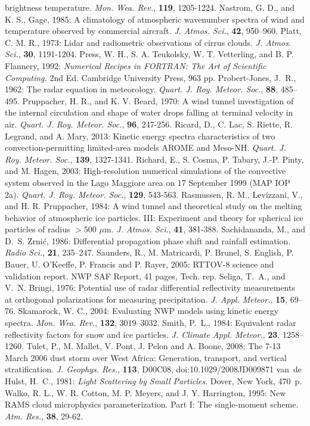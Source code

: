 brightness temperature.
      {\it Mon. Wea. Rev.}, 
      {\bf 119},
      1205-1224.
\decrefname
Nastrom, G. D., and K. S., Gage, 1985: A climatology of atmospheric wavenumber
  spectra of wind and temperature observed by commercial aircraft. {\em J.
  Atmos. Sci.}, {\bf 42}, 950--960.
\decrefname
Platt, C. M. R., 1973: Lidar and radiometric observations of cirrus clouds.
      {\it J. Atmos. Sci.}, 
      {\bf 30},
      1191-1204.
\decrefname
Press, W. H., S. A. Teukolsky, W. T. Vetterling, and B. P. Flannery, 1992:
      {\it Numerical Recipes in FORTRAN: The Art of Scientific Computing.}
      2nd Ed.
      Cambridge University Press,
      963 pp.
\decrefname
Probert-Jones, J.~R., 1962: The radar equation in meteorology. {\em Quart. J.
  Roy. Meteor. Soc.}, {\bf 88}, 485--495.
\decrefname
Pruppacher, H. R., and K. V. Beard, 1970: 
      A wind tunnel investigation of the internal circulation and shape of 
      water drops falling at terminal velocity in air.
      {\it Quart. J. Roy. Meteor. Soc.},
      {\bf 96},
      247-256.
\decrefname
Ricard, D., C. Lac, S. Riette, R. Legrand, and A. Mary, 2013: 
Kinetic energy spectra characteristics of two convection-permitting limited-area models AROME and Meso-NH.
{\it Quart. J. Roy. Meteor. Soc.}, {\bf 139}, 1327-1341.
\decrefname
Richard, E., S. Cosma, P. Tabary, J.-P. Pinty, and M. Hagen, 2003:
      High-resolution numerical simulations of the convective system observed
      in the Lago Maggiore area on 17 September 1999 (MAP IOP 2a).
      {\it Quart. J. Roy. Meteor. Soc.},
      {\bf 129},
      543-563.
\decrefname
Rasmussen, R. M., Levizzani, V., and H. R. Pruppacher, 1984:
      A wind tunnel and theoretical study on the melting behavior of 
      atmospheric ice particles. III: Experiment and theory for spherical 
      ice particles of radius $>500$ $\mu$m.
      {\it J. Atmos. Sci.},
      {\bf 41},
      381-388.
\decrefname
Sachidananda, M., and D.~S. Zrni\'c, 1986: Differential propagation phase shift
  and rainfall estimation. {\em Radio Sci.}, {\bf 21}, 235--247.
\decrefname
Saunders, R., M. Matricardi, P. Brunel, S. English, P. Bauer, U. O'Keeffe, P.
Francis and P. Rayer, 2005: RTTOV-8 science and validation report. NWP SAF
Report, 41 pages, Tech. rep.
\decrefname
Seliga, T.~A., and V.~N. Bringi, 1976: Potential use of radar differential
  reflectivity measurements at orthogonal polarizations for measuring
  precipitation. {\em J. Appl. Meteor.}, {\bf 15}, 69--76.
\decrefname
Skamarock, W. C., 2004: Evaluating NWP models using kinetic energy spectra.
  {\em Mon. Wea. Rev.}, {\bf 132}, 3019--3032.
\decrefname
Smith, P.~L., 1984: Equivalent radar reflectivity factors for snow and ice
  particles. {\em J. Climate Appl. Meteor.}, {\bf 23}, 1258--1260.
\decrefname
Tulet, P., M. Mallet, V. Pont, J. Pelon and A. Boone, 2008: The 7-13 March 2006 dust
  storm over West Africa: Generation, transport, and vertical stratification.
  {\it J. Geophys. Res.}, {\bf 113}, D00C08, doi:10.1029/2008JD009871
\decrefname
van~de Hulst, H.~C., 1981: {\em Light Scattering by Small Particles}. Dover,
  New York, 470~p.
\decrefname
Walko, R. L., W. R. Cotton, M. P. Meyers, and J. Y. Harrington, 1995:
      New RAMS cloud microphysics parameterization. Part I: The single-moment
      scheme.
      {\it Atm. Res.},
      {\bf 38},
      29-62.
\decrefname


